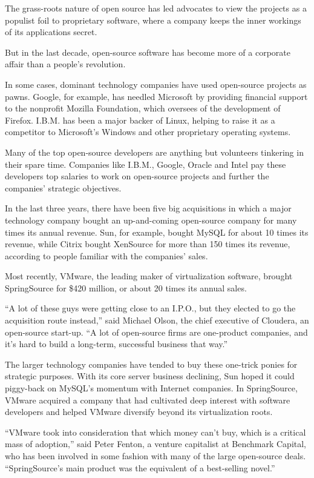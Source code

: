 ﻿\documentclass[12pt]{article}
\begin{document}
The grass-roots nature of open source has led advocates to view the projects as a populist foil to
proprietary software, where a company keeps the inner workings of its applications secret.

But in the last decade, open-source software has become more of a corporate affair than a people's
revolution.

In some cases, dominant technology companies have used open-source projects as pawns. Google, for
example, has needled Microsoft by providing financial support to the nonprofit Mozilla Foundation,
which oversees of the development of Firefox. I.B.M. has been a major backer of Linux, helping to
raise it as a competitor to Microsoft's Windows and other proprietary operating systems.

Many of the top open-source developers are anything but volunteers tinkering in their spare time.
Companies like I.B.M., Google, Oracle and Intel pay these developers top salaries to work on
open-source projects and further the companies' strategic objectives.

In the last three years, there have been five big acquisitions in which a major technology company
bought an up-and-coming open-source company for many times its annual revenue. Sun, for example,
bought MySQL for about 10 times its revenue, while Citrix bought XenSource for more than 150 times
its revenue, according to people familiar with the companies' sales.

Most recently, VMware, the leading maker of virtualization software, brought SpringSource for \$420
million, or about 20 times its annual sales.

``A lot of these guys were getting close to an I.P.O., but they elected to go the acquisition route
instead,'' said Michael Olson, the chief executive of Cloudera, an open-source start-up. ``A lot of
open-source firms are one-product companies, and it's hard to build a long-term, successful business
that way.''

The larger technology companies have tended to buy these one-trick ponies for strategic purposes.
With its core server business declining, Sun hoped it could piggy-back on MySQL's momentum with
Internet companies. In SpringSource, VMware acquired a company that had cultivated deep interest
with software developers and helped VMware diversify beyond its virtualization roots.

``VMware took into consideration that which money can't buy, which is a critical mass of adoption,''
said Peter Fenton, a venture capitalist at Benchmark Capital, who has been involved in some fashion
with many of the large open-source deals. ``SpringSource's main product was the equivalent of a
best-selling novel.''
\end{document}
